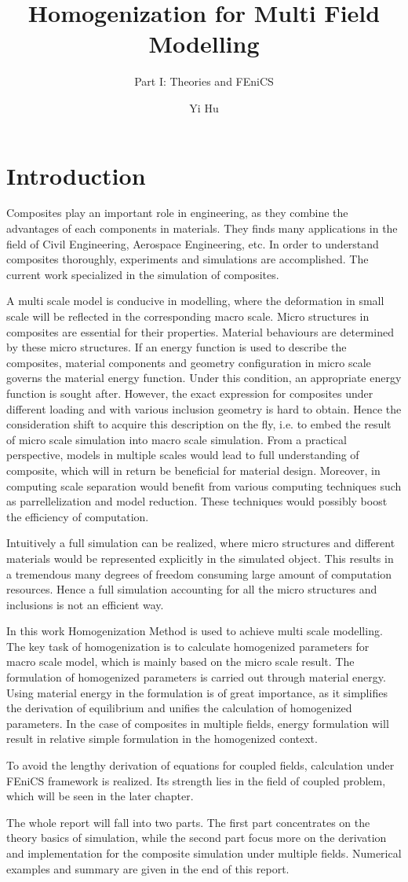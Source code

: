 \documentclass[10pt,a4paper]{scrreprt}
\author{Yi Hu}
\title{Homogenization for Multi Field Modelling}
\subtitle{Part I: Theories and FEniCS}
\begin{document}
\chapter{Introduction}

Composites play an important role in engineering, as they combine the advantages of each components in materials. They finds many applications in the field of Civil Engineering, Aerospace Engineering, etc. In order to understand composites thoroughly, experiments and simulations are accomplished. The current work specialized in the simulation of composites.

A multi scale model is conducive in modelling, where the deformation in small scale will be reflected in the corresponding macro scale. Micro structures in composites are essential for their properties. Material behaviours are determined by these micro structures. If an energy function is used to describe the composites, material components and geometry configuration in micro scale governs the material energy function. Under this condition, an appropriate energy function is sought after. However, the exact expression for composites under different loading and with various inclusion geometry is hard to obtain. Hence the consideration shift to acquire this description on the fly, i.e. to embed the result of micro scale simulation into macro scale simulation. From a practical perspective, models in multiple scales would lead to full understanding of composite, which will in return be beneficial for material design. Moreover, in computing scale separation would benefit from various computing techniques such as parrellelization and model reduction. These techniques would possibly boost the efficiency of computation. 

Intuitively a full simulation can be realized, where micro structures and different materials would be represented explicitly in the simulated object. This results in a tremendous many degrees of freedom consuming large amount of computation resources. Hence a full simulation accounting for all the micro structures and inclusions is not an efficient way.

In this work Homogenization Method is used to achieve multi scale modelling. The key task of homogenization is to calculate homogenized parameters for macro scale model, which is mainly based on the micro scale result. The formulation of homogenized parameters is carried out through material energy. Using material energy in the formulation is of great importance, as it simplifies the derivation of equilibrium and unifies the calculation of homogenized parameters. In the case of composites in multiple fields, energy formulation will result in relative simple formulation in the homogenized context. 

To avoid the lengthy derivation of equations for coupled fields, calculation under FEniCS framework is realized. Its strength lies in the field of coupled problem, which will be seen in the later chapter. 

The whole report will fall into two parts. The first part concentrates on the theory basics of simulation, while the second part focus more on the derivation and implementation for the composite simulation under multiple fields. Numerical examples and summary are given in the end of this report.
\end{document}
